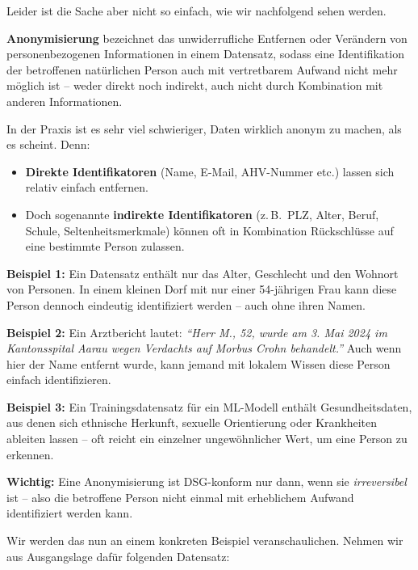 \begin{lpu}
Leider ist die Sache aber nicht so einfach, wie wir nachfolgend sehen werden.


\begin{theorie}\textbf{Anonymisierung} bezeichnet das unwiderrufliche Entfernen oder Verändern von personenbezogenen Informationen in einem Datensatz, sodass eine Identifikation der betroffenen natürlichen Person auch mit vertretbarem Aufwand nicht mehr möglich ist – weder direkt noch indirekt, auch nicht durch Kombination mit anderen Informationen.
\end{theorie}

In der Praxis ist es sehr viel schwieriger, Daten wirklich anonym zu machen, als es scheint. Denn:

\begin{itemize}
  \item \textbf{Direkte Identifikatoren} (Name, E-Mail, AHV-Nummer etc.) lassen sich relativ einfach entfernen.
  \item Doch sogenannte \textbf{indirekte Identifikatoren} (z.\,B.\ PLZ, Alter, Beruf, Schule, Seltenheitsmerkmale) können oft in Kombination Rückschlüsse auf eine bestimmte Person zulassen.
\end{itemize}

\vspace{0.5em}
\textbf{Beispiel 1:}  
Ein Datensatz enthält nur das Alter, Geschlecht und den Wohnort von Personen. In einem kleinen Dorf mit nur einer 54-jährigen Frau kann diese Person dennoch eindeutig identifiziert werden – auch ohne ihren Namen.

\vspace{0.5em}
\textbf{Beispiel 2:}  
Ein Arztbericht lautet:  
\emph{``Herr M., 52, wurde am 3. Mai 2024 im Kantonsspital Aarau wegen Verdachts auf Morbus Crohn behandelt.''}  Auch wenn hier der Name entfernt wurde, kann jemand mit lokalem Wissen diese Person einfach identifizieren.

\vspace{0.5em}
\textbf{Beispiel 3:}  
Ein Trainingsdatensatz für ein ML-Modell enthält Gesundheitsdaten, aus denen sich ethnische Herkunft, sexuelle Orientierung oder Krankheiten ableiten lassen – oft reicht ein einzelner ungewöhnlicher Wert, um eine Person zu erkennen.

\textbf{Wichtig:} Eine Anonymisierung ist DSG-konform nur dann, wenn sie \emph{irreversibel} ist – also die betroffene Person nicht einmal mit erheblichem Aufwand identifiziert werden kann.

Wir werden das nun an einem konkreten Beispiel veranschaulichen. Nehmen wir aus Ausgangslage dafür folgenden Datensatz:


\end{lpu}
